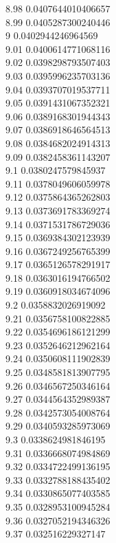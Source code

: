 {8.98	0.0407644010406657\\
8.99	0.0405287300240446\\
9	0.0402944246964569\\
9.01	0.0400614771068116\\
9.02	0.0398298793507403\\
9.03	0.0395996235703136\\
9.04	0.0393707019537711\\
9.05	0.0391431067352321\\
9.06	0.0389168301944343\\
9.07	0.0386918646564513\\
9.08	0.0384682024914313\\
9.09	0.0382458361143207\\
9.1	0.0380247579845937\\
9.11	0.0378049606059978\\
9.12	0.0375864365262803\\
9.13	0.0373691783369274\\
9.14	0.0371531786729036\\
9.15	0.0369384302123939\\
9.16	0.0367249256765399\\
9.17	0.0365126578291917\\
9.18	0.0363016194766502\\
9.19	0.0360918034674096\\
9.2	0.0358832026919092\\
9.21	0.0356758100822885\\
9.22	0.0354696186121299\\
9.23	0.0352646212962164\\
9.24	0.0350608111902839\\
9.25	0.0348581813907795\\
9.26	0.0346567250346164\\
9.27	0.0344564352989387\\
9.28	0.0342573054008764\\
9.29	0.0340593285973069\\
9.3	0.0338624981846195\\
9.31	0.0336668074984869\\
9.32	0.0334722499136195\\
9.33	0.0332788188435402\\
9.34	0.0330865077403585\\
9.35	0.0328953100945284\\
9.36	0.0327052194346326\\
9.37	0.032516229327147\\
}
